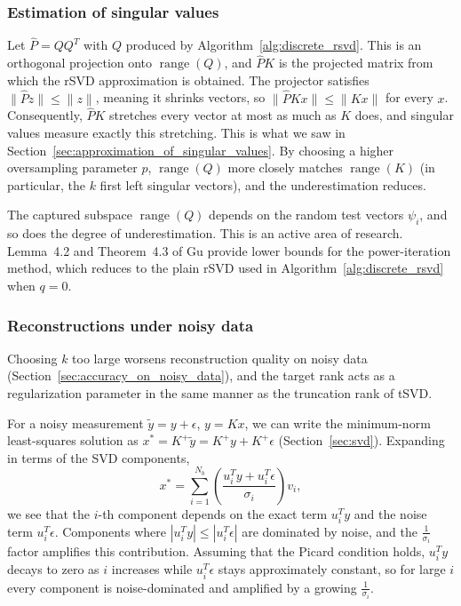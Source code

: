 \subsubsection{Estimation of singular values}
Let $\hat P = QQ^T$ with $Q$ produced by Algorithm~\ref{alg:discrete_rsvd}. This is an orthogonal projection onto $\operatorname{range}(Q)$, and $\hat P K$ is the projected matrix from which the rSVD approximation is obtained. The projector satisfies $\| \hat P z \| \le \| z \|$, meaning it shrinks vectors, so $\| \hat P K x  \| \le \|K x \|$ for every $x$. Consequently, $\hat P K$ stretches every vector at most as much as $K$ does, and singular values measure exactly this stretching. This is what we saw in Section~\ref{sec:approximation_of_singular_values}. By choosing a higher oversampling parameter $p$, $\operatorname{range}(Q)$ more closely matches $\operatorname{range}(K)$ (in particular, the $k$ first left singular vectors), and the underestimation reduces.

The captured subspace $\operatorname{range}(Q)$ depends on the random test vectors $\psi_i$, and so does the degree of underestimation. This is an active area of research. Lemma~4.2 and Theorem~4.3 of Gu \cite{guSubspaceIterationRandomization2015} provide lower bounds for the power-iteration method, which reduces to the plain rSVD used in Algorithm~\ref{alg:discrete_rsvd} when $q = 0$.


\subsubsection{Reconstructions under noisy data}
Choosing $k$ too large worsens reconstruction quality on noisy data (Section~\ref{sec:accuracy_on_noisy_data}), and the target rank acts as a regularization parameter in the same manner as the truncation rank of tSVD.

For a noisy measurement $\tilde y = y + \epsilon$, $y = K x$, we can write the minimum-norm least-squares solution as $x^* = K^+ \tilde y = K^+ y + K^+ \epsilon$ (Section~\ref{sec:svd}). Expanding in terms of the SVD components,
\begin{equation*}
    x^* = \sum_{i=1}^{N_b}
    \left(\frac{u_i^T y + u_i^T \epsilon}{\sigma_i}\right) v_i,
\end{equation*}
we see that the $i$-th component depends on the exact term $u_i^T y$ and the noise term $u_i^T \epsilon$. Components where $|u_i^T y| \le |u_i^T \epsilon|$ are dominated by noise, and the $\tfrac{1}{\sigma_i}$ factor amplifies this contribution. Assuming that the Picard condition \cite{hansen2010discrete} holds, $u_i^T y$ decays to zero as $i$ increases while $u_i^T \epsilon$ stays approximately constant, so for large $i$ every component is noise-dominated and amplified by a growing $\tfrac{1}{\sigma_i}$.

